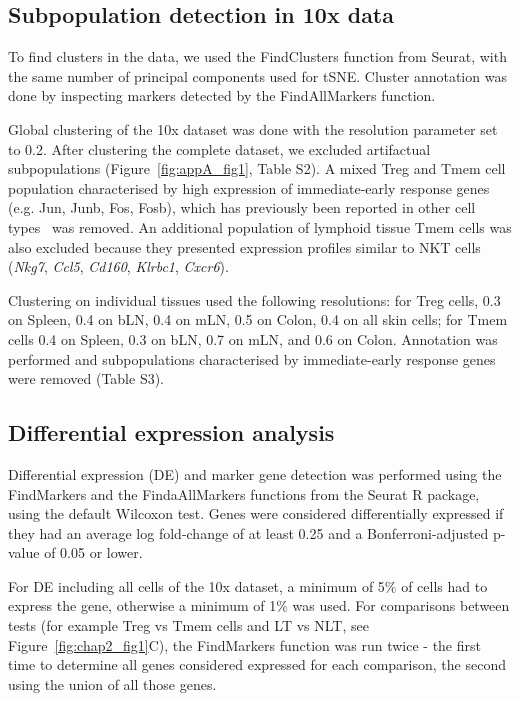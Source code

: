 \subsection{Subpopulation detection in 10x data}
To find clusters in the data, we used the FindClusters function from Seurat, with the same number of principal components used for tSNE. Cluster annotation was done by inspecting markers detected by the FindAllMarkers function.

Global clustering of the 10x dataset was done with the resolution parameter set to 0.2. After clustering the complete dataset, we excluded artifactual subpopulations (Figure~\ref{fig:appA_fig1}, Table S2). A mixed Treg and Tmem cell population characterised by high expression of immediate-early response genes (e.g. Jun, Junb, Fos, Fosb), which has previously been reported in other cell types~\citep{Adam2017-wd,Van_den_Brink2017-lg,Wu2017-jn} was removed. An additional population of lymphoid tissue Tmem cells was also excluded because they presented expression profiles similar to NKT cells (\textit{Nkg7}, \textit{Ccl5}, \textit{Cd160}, \textit{Klrbc1}, \textit{Cxcr6}).

Clustering on individual tissues used the following resolutions: for Treg cells, 0.3 on Spleen, 0.4 on bLN, 0.4 on mLN, 0.5 on Colon, 0.4 on all skin cells; for Tmem cells 0.4 on Spleen, 0.3 on bLN, 0.7 on mLN, and 0.6 on Colon. Annotation was performed and subpopulations characterised by immediate-early response genes were removed (Table S3).

\subsection{Differential expression analysis}
Differential expression (DE) and marker gene detection was performed using the FindMarkers and the FindaAllMarkers functions from the Seurat R package, using the default Wilcoxon test. Genes were considered differentially expressed if they had an average log fold-change of at least 0.25 and a Bonferroni-adjusted p-value of 0.05 or lower. 

For DE including all cells of the 10x dataset, a minimum of 5${\%}$ of cells had to express the gene, otherwise a minimum of 1${\%}$ was used. For comparisons between tests (for example Treg vs Tmem cells and LT vs NLT, see Figure~\ref{fig:chap2_fig1}C), the FindMarkers function was run twice - the first time to determine all genes considered expressed for each comparison, the second using the union of all those genes.

